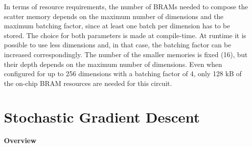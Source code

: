 \documentclass[11pt,dvipdfm]{article}
\begin{document}
	

In terms of resource requirements, the number of BRAMs needed to compose the scatter memory depends on the maximum number of dimensions and the maximum batching factor, since at least one batch per dimension has to be stored. The choice for both parameters is made at compile-time. At runtime it is possible to use less dimensions and, in that case, the batching factor can be increased correspondingly. The number of the smaller memories is fixed (16), but their depth depends on the maximum number of dimensions. Even when configured for up to 256 dimensions with a batching factor of 4, only 128 kB %
of the on-chip BRAM resources are needed for this circuit. 


\section{Stochastic Gradient Descent}
\label{sec:sgd}
\paragraph{\textbf{Overview}}
\end{document}
